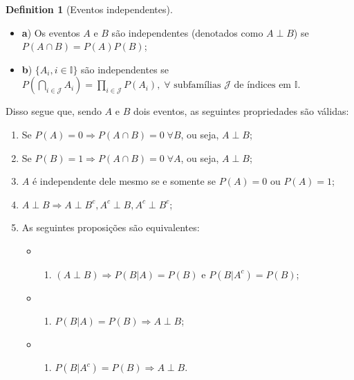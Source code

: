 \documentclass[
]{article}
\providecommand{\tightlist}{%
  \setlength{\itemsep}{0pt}\setlength{\parskip}{0pt}}
\theoremstyle{definition}
\newtheorem{definition}{Definition}[section]
\theoremstyle{definition}
\theoremstyle{definition}
\theoremstyle{definition}
\theoremstyle{remark}
\begin{document}
\begin{definition}[Eventos independentes]
\leavevmode

\begin{itemize}
\tightlist
\item
  \textbf{a}) Os eventos \(A\) e \(B\) são independentes (denotados como \(A \perp B\)) se \(P(A \cap B) = P(A)P(B)\);
\item
  \textbf{b}) \(\{A_{i}, i \in \mathbb{I}\}\) são independentes se \(P\left(\bigcap_{i \in \mathcal{J}}A_{i}\right) = \prod_{i \in \mathcal{J}}P(A_{i}), \; \forall\text{ subfamílias } \mathcal{J} \text{ de índices em } \mathbb{I}\).
\end{itemize}

\end{definition}

Disso segue que, sendo \(A\) e \(B\) dois eventos, as seguintes propriedades são válidas:

\begin{enumerate}
\def\labelenumi{\arabic{enumi}.}
\tightlist
\item
  Se \(P(A) = 0 \Rightarrow P(A \cap B) = 0 \; \forall B\), ou seja, \(A \perp B\);
\item
  Se \(P(B) = 1 \Rightarrow P(A \cap B) = 0 \; \forall A\), ou seja, \(A \perp B\);
\item
  \(A\) é independente dele mesmo se e somente se \(P(A) = 0\) ou \(P(A) = 1\);
\item
  \(A \perp B \Rightarrow A \perp B^{c}, A^{c} \perp B, A^{c} \perp B^{c}\);
\item
  As seguintes proposições são equivalentes:

  \begin{itemize}
  \item
    \begin{enumerate}
    \def\labelenumii{\alph{enumii})}
    \tightlist
    \item
      \((A \perp B) \Rightarrow P(B|A) = P(B)\) e \(P(B|A^{c}) = P(B)\);
    \end{enumerate}
  \item
    \begin{enumerate}
    \def\labelenumii{\alph{enumii})}
    \setcounter{enumii}{1}
    \tightlist
    \item
      \(P(B|A) = P(B) \Rightarrow A \perp B\);
    \end{enumerate}
  \item
    \begin{enumerate}
    \def\labelenumii{\alph{enumii})}
    \setcounter{enumii}{2}
    \tightlist
    \item
      \(P(B|A^{c}) = P(B) \Rightarrow A \perp B\).
    \end{enumerate}
  \end{itemize}
\end{enumerate}
\end{document}
